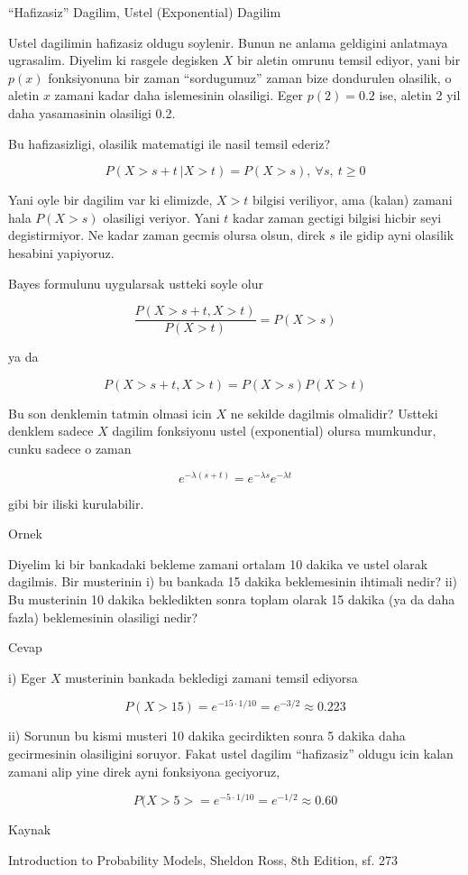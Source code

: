 \documentclass[12pt,fleqn]{article}
\begin{document}
``Hafizasiz'' Dagilim, Ustel (Exponential) Dagilim

Ustel dagilimin hafizasiz oldugu soylenir. Bunun ne anlama geldigini
anlatmaya ugrasalim. Diyelim ki rasgele degisken $X$ bir aletin omrunu
temsil ediyor, yani bir $p(x)$ fonksiyonuna bir zaman ``sordugumuz'' zaman
bize dondurulen olasilik, o aletin $x$ zamani kadar daha islemesinin
olasiligi. Eger $p(2) = 0.2$ ise, aletin 2 yil daha yasamasinin olasiligi
0.2. 

Bu hafizasizligi, olasilik matematigi ile nasil temsil ederiz?

\[ P( X>s+t \ | X>t ) =  P(X>s) , \ \forall s, \ t \ge 0 \]

Yani oyle bir dagilim var ki elimizde, $X>t$ bilgisi veriliyor, ama (kalan)
zamani hala $P(X>s)$ olasiligi veriyor. Yani $t$ kadar zaman gectigi 
bilgisi hicbir seyi degistirmiyor. Ne kadar zaman gecmis olursa olsun,
direk $s$ ile gidip ayni olasilik hesabini yapiyoruz. 

Bayes formulunu uygularsak ustteki soyle olur

\[  \frac{P( X>s+t,  X>t )}{P(X>t)} = P(X>s)  \]


ya da

\[  P( X>s+t,  X>t ) = P(X>s)P(X>t) \]

Bu son denklemin tatmin olmasi icin $X$ ne sekilde dagilmis olmalidir?
Ustteki denklem sadece $X$ dagilim fonksiyonu ustel (exponential) olursa
mumkundur, cunku sadece o zaman

\[ e^{-\lambda(s+t)}  = e^{-\lambda s} e^{-\lambda t}\]

gibi bir iliski kurulabilir. 

Ornek

Diyelim ki bir bankadaki bekleme zamani ortalam 10 dakika ve ustel olarak
dagilmis. Bir musterinin i) bu bankada 15 dakika beklemesinin ihtimali
nedir? ii) Bu musterinin 10 dakika bekledikten sonra toplam olarak 15
dakika (ya da daha fazla) beklemesinin olasiligi nedir? 

Cevap

i) Eger $X$ musterinin bankada bekledigi zamani temsil ediyorsa

\[ P(X>15) = e^{-15 \cdot 1/10} = e^{-3/2} \approx 0.223 \]

ii) Sorunun bu kismi musteri 10 dakika gecirdikten sonra 5 dakika daha
gecirmesinin olasiligini soruyor. Fakat ustel dagilim ``hafizasiz'' oldugu
icin kalan zamani alip yine direk ayni fonksiyona geciyoruz, 

\[ P(X>5> = e^{-5 \cdot 1/10} = e^{-1/2} \approx 0.60\]

Kaynak

Introduction to Probability Models, Sheldon Ross, 8th Edition, sf. 273
\end{document}
